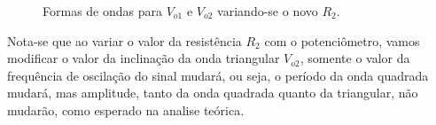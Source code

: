 \begin{figure}[H] 
\centering
{}
\caption{Formas de ondas para $V_{o1}$ e $V_{o2}$ variando-se o novo $R_2$.}
\label{cut}
\end{figure}

Nota-se que ao variar o valor da resistência $R_2$ com o potenciômetro, vamos modificar o valor da inclinação da onda triangular $V_{o2}$, somente o valor
da frequência de oscilação do sinal mudará, ou seja, o período da onda quadrada mudará, mas amplitude, tanto da onda quadrada quanto da triangular, não mudarão, como esperado na analise teórica.

